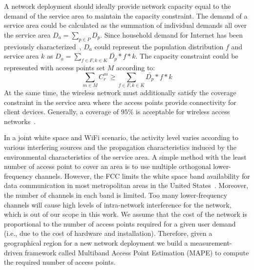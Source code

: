 A network deployment should ideally provide network capacity equal to the demand of the service 
area to maintain the capacity constraint. The demand of a service area could be calculated as the 
summation of individual demands all over the service area $D_a=\sum_{p\in P}D_p$. Since 
household demand for Internet has been previously characterized~\cite{rosston2011household}, 
$D_a$ could represent the population distribution $f$ and service area $k$ as 
$D_a=\sum_{f \in F,k \in K}\bar{D_p}*f*k$. 
The capacity constraint could be represented with access points set $M$ according to:
\begin{equation}
\label{eq:nlbound}
\sum_{m \in M}C_r^m \ge \sum_{f \in F,k \in K}\bar{D_p}*f*k
\end{equation}
At the same time, the wireless network must additionally satisfy the coverage constraint in the service 
area where the access points provide connectivity for client devices. 
Generally, a coverage of $95\%$ is acceptable for wireless access networks~\cite{robinson2010deploying}.

In a joint white space and WiFi scenario, the activity level varies according to various interfering 
sources and the propagation characteristics induced by the environmental characteristics of the service area.
A simple method with the least number of access point to cover an area is to use 
multiple orthogonal lower-frequency channels. However, the FCC limits the white space band availability 
for data communication in most metropolitan areas in the United States~\cite{googledatabase}. Moreover, the 
number of channels in each band is limited. Too many lower-frequency channels will cause high levels of 
intra-network interference for the network, which is out of our scope in this work. We assume that the 
cost of the network is proportional to the number of access points required for a given user demand (i.e., due
to the cost of hardware and installation). Therefore, given a geographical region for a new network deployment
we build a measurement-driven framework called Multiband Access Point Estimation (MAPE) to compute the required
number of access points.

